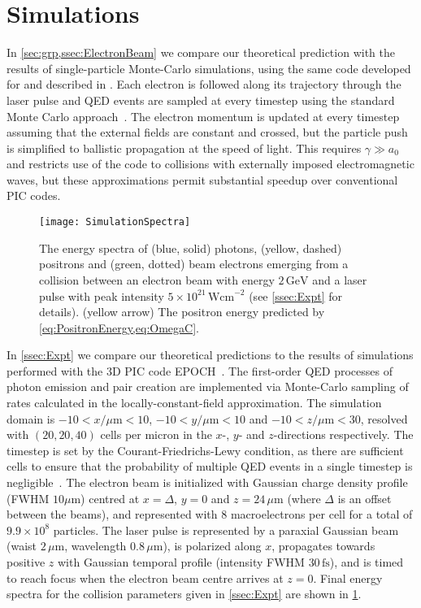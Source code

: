 \documentclass[reprint,superscriptaddress,amsmath,amssymb,aps,pra]{revtex4-1}
\newcommand{\micron}{{\mu\mathrm{m}}}
\newcommand{\Wcm}{\mathrm{Wcm}}
\newcommand{\fs}{\mathrm{fs}}
\begin{document}
\section{Simulations}
\label{app:pic}

In \cref{sec:grp,ssec:ElectronBeam} we compare our theoretical prediction with
the results of single-particle Monte-Carlo simulations, using the same
code developed for and described in \cite{Blackburn,Blackburn2}.
Each electron is followed along its trajectory through the laser pulse
and QED events are sampled at every timestep using the standard Monte Carlo
approach~\cite{Duclous}.
The electron momentum is updated at every timestep assuming that the
external fields are constant and crossed, but the particle push
is simplified to ballistic propagation at the speed of light.
This requires $\gamma \gg a_0$ and restricts use of the code to
collisions with externally imposed electromagnetic
waves, but these approximations permit substantial speedup over
conventional PIC codes.

	\begin{figure}
	\texttt{[image: SimulationSpectra]}
	\caption[Simulation spectra]
			{The energy spectra of (blue, solid) photons, (yellow, dashed) positrons and
			(green, dotted) beam electrons
			emerging from a collision between an electron
			beam with energy $2\,\text{GeV}$ and a laser pulse with peak intensity
			$5\times10^{21}\,\Wcm^{-2}$ (see \cref{ssec:Expt} for details).
			(yellow arrow) The positron energy predicted by
			\cref{eq:PositronEnergy,eq:OmegaC}.}
	\label{fig:SimulationSpectra}
	\end{figure}

In \cref{ssec:Expt} we compare our theoretical predictions to the results of
simulations performed with the 3D PIC code \textsc{EPOCH}~\cite{Epoch}.
The first-order QED processes of photon emission and pair creation
are implemented via Monte-Carlo sampling of rates calculated in the
locally-constant-field approximation.
The simulation domain is $-10 < x/\micron < 10$,
$-10 < y/\micron < 10$ and $-10 < z/\micron < 30$, resolved with $(20,20,40)$
cells per micron in the $x$-, $y$- and $z$-directions respectively.
The timestep is set by the Courant-Friedrichs-Lewy condition, as there are sufficient cells
to ensure that the probability of multiple QED events in
a single timestep is negligible~\cite{RidgersJCP}.
The electron beam is initialized with Gaussian charge density profile
(FWHM $10\micron$) centred at $x = \Delta$, $y=0$ and $z = 24\,\micron$ (where
$\Delta$ is an offset between the beams), and represented with
8 macroelectrons per cell for a total of $9.9\times10^8$ particles.
The laser pulse is represented by a paraxial
Gaussian beam (waist $2\,\micron$, wavelength $0.8\,\micron$), is polarized
along $x$, propagates towards positive $z$ with
Gaussian temporal profile (intensity FWHM $30\,\fs$), and is timed to reach
focus when the electron beam centre arrives at $z=0$.
Final energy spectra for the collision parameters given in
\cref{ssec:Expt} are shown in \cref{fig:SimulationSpectra}.


\end{document}
